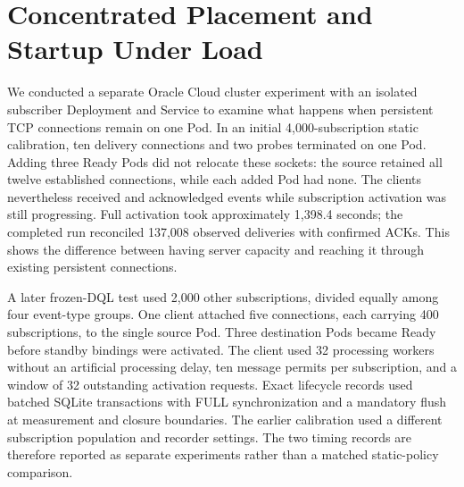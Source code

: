 \section{Concentrated Placement and Startup Under Load}
\label{sec:mumbai-startup}

We conducted a separate Oracle Cloud cluster experiment with an isolated subscriber
Deployment and Service to examine what happens when persistent TCP connections remain on one Pod. In an initial 4,000-subscription static calibration, ten delivery
connections and two probes terminated on one Pod. Adding three Ready Pods did
not relocate these sockets: the source retained all twelve established
connections, while each added Pod had none. The clients nevertheless received
and acknowledged events while subscription activation was still progressing.
Full activation took approximately 1,398.4 seconds; the completed run reconciled
137,008 observed deliveries with confirmed ACKs. This shows the difference between having server capacity and reaching it
through existing persistent connections.

A later frozen-DQL test used 2,000 other subscriptions, divided
equally among four event-type groups. One client attached five connections,
each carrying 400 subscriptions, to the single source Pod. Three destination
Pods became Ready before standby bindings were activated. The client used
32 processing workers without an artificial processing delay, ten message
permits per subscription, and a window of 32 outstanding activation requests.
Exact lifecycle records used batched SQLite transactions with FULL
synchronization and a mandatory flush at measurement and closure boundaries.
The earlier calibration used a different subscription population and recorder
settings. The two timing records are therefore reported as separate
experiments rather than a matched static-policy comparison.

